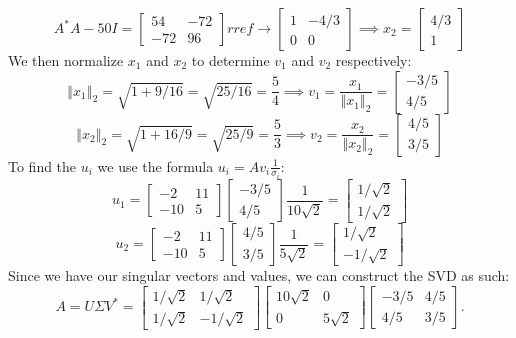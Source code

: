 \documentclass[12pt]{article}
\numberwithin{equation}{section}
\newcommand{\norm}[1]{\left\Vert#1\right\Vert}
\begin{document}
\begin{enumerate}
\begin{enumerate}
        $$A^*A-50I=\left[\begin{array}{cc}54&-72\\-72&96\end{array}\right]rref\to\left[\begin{array}{cc}1&-4/3\\0&0\end{array}\right]\implies x_2=\left[\begin{array}{c}4/3\\1\end{array}\right]$$
        We then normalize $x_1$ and $x_2$ to determine $v_1$ and $v_2$ respectively:
        $$\norm{x_1}_2=\sqrt{1+9/16}=\sqrt{25/16}=\frac{5}{4}\implies v_1=\frac{x_1}{\norm{x_1}_2}=\left[\begin{array}{c}-3/5\\4/5\end{array}\right]$$
        $$\norm{x_2}_2=\sqrt{1+16/9}=\sqrt{25/9}=\frac{5}{3}\implies v_2=\frac{x_2}{\norm{x_2}_2}=\left[\begin{array}{c}4/5\\3/5\end{array}\right]$$
        To find the $u_i$ we use the formula $u_i=Av_i\frac{1}{\sigma_i}$:
        $$u_1=\left[\begin{array}{cc}-2&11\\-10&5\end{array}\right]\left[\begin{array}{c}-3/5\\4/5\end{array}\right]\frac{1}{10\sqrt{2}}=\left[\begin{array}{c}1/\sqrt{2}\\1/\sqrt{2}\end{array}\right]$$
        $$u_2=\left[\begin{array}{cc}-2&11\\-10&5\end{array}\right]\left[\begin{array}{c}4/5\\3/5\end{array}\right]\frac{1}{5\sqrt{2}}=\left[\begin{array}{c}1/\sqrt{2}\\-1/\sqrt{2}\end{array}\right]$$
        Since we have our singular vectors and values, we can construct the SVD as such:
        $$A=U\Sigma V^*=\left[\begin{array}{cc}1/\sqrt{2}&1/\sqrt{2}\\1/\sqrt{2}&-1/\sqrt{2}\end{array}\right]\left[\begin{array}{cc}10\sqrt{2}&0\\0&5\sqrt{2}\end{array}\right]\left[\begin{array}{cc}-3/5&4/5\\4/5&3/5\end{array}\right].$$

\end{enumerate}
\end{enumerate}
\end{document}
